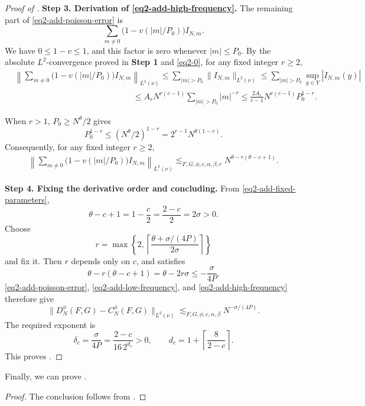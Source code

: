 \documentclass[reqno,12pt]{amsart}
\numberwithin{equation}{section}
\begin{document}
\begin{proof}[Proof of ]
\medskip
\noindent\textbf{Step 3. Derivation of \eqref{eq2-add-high-frequency}.}
The remaining part of \eqref{eq2-add-poisson-error} is
\[
 \sum_{m\ne0}\bigl(1-v(|m|/P_0)\bigr)I_{N,m}.
\]
We have $0\le1-v\le1$, and this factor is zero whenever $|m|\le P_0$.
By the absolute $L^2$-convergence proved in {\bf Step 1} and \eqref{eq2-0}, for any fixed integer
$r\ge2$,
\begin{align*}
 &\left\|\sum_{m\ne0}\bigl(1-v(|m|/P_0)\bigr)I_{N,m}
              \right\|_{L^2(\nu)}
\le\sum_{|m|>P_0}\|I_{N,m}\|_{L^2(\nu)}
\le\sum_{|m|>P_0}\sup_{y\in Y}|I_{N,m}(y)|\\
 &\hspace{6cm}\le A_rN^{r(c-1)}\sum_{|m|>P_0}|m|^{-r}
 \le\frac{2A_r}{r-1}N^{r(c-1)}P_0^{1-r}.
\end{align*}

When $r>1$, $P_0\ge N^\theta/2$ gives
\[
 P_0^{1-r}\le(N^\theta/2)^{1-r}
 =2^{r-1}N^{\theta(1-r)}.
\]
Consequently, for any fixed integer
$r\ge2$,
\begin{align}
 \left\|\sum_{m\ne0}\bigl(1-v(|m|/P_0)\bigr)I_{N,m}
              \right\|_{L^2(\nu)}
 \lesssim_{F,G,\phi,c,\alpha,\beta,r} N^{\theta-r(\theta-c+1)}.
 \label{eq2-add-high-frequency}
\end{align}

\medskip
\noindent\textbf{Step 4. Fixing the derivative order and concluding.}
From \eqref{eq2-add-fixed-parameters},
\[
 \theta-c+1=1-\frac c2=\frac{2-c}{2}=2\sigma>0.
\]
Choose
\[
 r=\max\left\{2,
 \left\lceil\frac{\theta+\sigma/(4P)}{2\sigma}\right\rceil\right\}
\]
and fix it. Then $r$ depends only on $c$, and satisfies
\[
 \theta-r(\theta-c+1)=\theta-2r\sigma
 \le-\frac{\sigma}{4P}.
\]
\eqref{eq2-add-poisson-error},
\eqref{eq2-add-low-frequency}, and \eqref{eq2-add-high-frequency}
therefore give
\[
 \|D_N^\phi(F,G)-C_N^\phi(F,G)\|_{L^2(\nu)}
 \lesssim_{F,G,\phi,c,\alpha,\beta}N^{-\sigma/(4P)}.
\]
The required exponent is
\begin{equation}
 \delta_c=\frac{\sigma}{4P}
 =\frac{2-c}{16\,2^{d_c}}>0,
 \qquad d_c=1+\left\lceil\frac8{2-c}\right\rceil.
 \label{eq2-add-decay-exponent}
\end{equation}
This proves .
\end{proof}
Finally, we can prove .
\begin{proof}
The conclusion follows from .
\end{proof}
\end{document}
